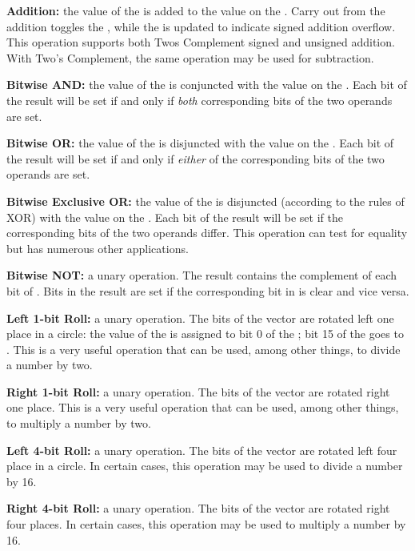 \begin{description}

\item{\bfseries Addition:} the value of the \AC{} is added to the
  value on the \IBUS. Carry out from the addition toggles the \Lreg,
  while the \Vreg is updated to indicate signed addition
  overflow. This operation supports both \gls{Twos Complement} signed
  and unsigned addition. With Two's Complement, the same operation may
  be used for subtraction.

\item{\bfseries Bitwise AND:} the value of the \AC{} is conjuncted
  with the value on the \IBUS. Each bit of the result will be set if
  and only if {\em both\/} corresponding bits of the two operands are
  set.

\item{\bfseries Bitwise OR:} the value of the \AC{} is disjuncted with
  the value on the \IBUS. Each bit of the result will be set if and
  only if {\em either\/} of the corresponding bits of the two operands
  are set.

\item{\bfseries Bitwise Exclusive OR:} the value of the \AC{} is
  disjuncted (according to the rules of XOR) with the value on the
  \IBUS. Each bit of the result will be set if the corresponding bits
  of the two operands differ. This operation can test for equality but
  has numerous other applications.

\item{\bfseries Bitwise NOT:} a unary operation. The result contains
  the complement of each bit of \AC{}. Bits in the result are set if
  the corresponding bit in \AC{} is clear and vice versa.

\item{\bfseries Left 1-bit Roll:} a unary operation. The bits of the
  \LAC{} vector are rotated left one place in a circle: the value
  of the \Lreg{} is assigned to bit 0 of the \AC{}; bit 15 of the
  \AC{} goes to \Lreg{}. This is a very useful operation that can be
  used, among other things, to divide a number by two.

\item{\bfseries Right 1-bit Roll:} a unary operation. The bits of the
  \LAC{} vector are rotated right one place. This is a very useful
  operation that can be used, among other things, to multiply a number
  by two.

\item{\bfseries Left 4-bit Roll:} a unary operation. The bits of the
  \LAC{} vector are rotated left four place in a circle. In
  certain cases, this operation may be used to divide a number by
  16.

\item{\bfseries Right 4-bit Roll:} a unary operation. The bits of the
  \LAC{} vector are rotated right four places. In certain cases,
  this operation may be used to multiply a number by 16.

\end{description}


